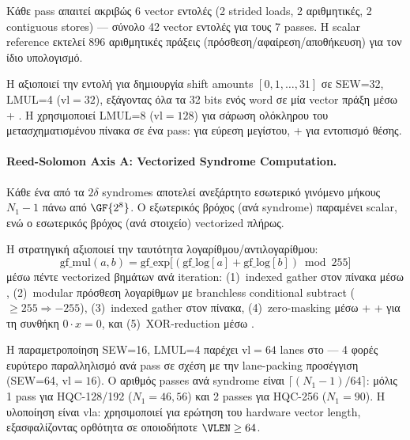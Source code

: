 Κάθε pass απαιτεί ακριβώς \num{6} vector εντολές (2 strided loads, 2
αριθμητικές, 2 contiguous stores) — σύνολο \num{42} vector εντολές για
τους \num{7} passes.  Η scalar reference εκτελεί \num{896} αριθμητικές
πράξεις (πρόσθεση/αφαίρεση/αποθήκευση) για τον ίδιο υπολογισμό.

Η  αξιοποιεί την εντολή  για δημιουργία
shift amounts $[0, 1, \ldots, 31]$ σε SEW=32, LMUL=4 ($\text{vl}=32$),
εξάγοντας όλα τα \num{32} bits ενός  word σε μία vector
πράξη μέσω  + .  Η  χρησιμοποιεί
LMUL=8 ($\text{vl}=128$) για σάρωση ολόκληρου του μετασχηματισμένου
πίνακα σε ένα pass:  για εύρεση μεγίστου,  +
 για εντοπισμό θέσης.

\paragraph{Reed-Solomon Axis A: Vectorized Syndrome Computation.}
Κάθε ένα από τα $2\delta$ syndromes αποτελεί ανεξάρτητο εσωτερικό γινόμενο
μήκους $N_1 - 1$ πάνω από $\GF{2^8}$.  Ο εξωτερικός βρόχος (ανά syndrome)
παραμένει scalar, ενώ ο εσωτερικός βρόχος (ανά στοιχείο) vectorized πλήρως.

Η στρατηγική αξιοποιεί την ταυτότητα λογαρίθμου/αντιλογαρίθμου:
\begin{equation}
  \text{gf\_mul}(a, b) = \text{gf\_exp}\bigl[(\text{gf\_log}[a] + \text{gf\_log}[b]) \bmod 255\bigr]
\end{equation}
%
μέσω πέντε vectorized βημάτων ανά iteration: (1)~indexed gather στον
 πίνακα μέσω , (2)~modular πρόσθεση
λογαρίθμων με branchless conditional subtract ($\geq 255 \Rightarrow -255$),
(3)~indexed gather στον  πίνακα, (4)~zero-masking μέσω
 +  +  για τη συνθήκη $0 \cdot x = 0$,
και (5)~XOR-reduction μέσω .

Η παραμετροποίηση SEW=16, LMUL=4 παρέχει $\text{vl}=64$ lanes στο
 — \num{4} φορές ευρύτερο παραλληλισμό ανά pass σε σχέση με
την \Zvbc lane-packing προσέγγιση (SEW=64, $\text{vl}=16$).  Ο αριθμός
passes ανά syndrome είναι $\lceil (N_1 - 1) / 64 \rceil$: μόλις \num{1}
pass για HQC-128/192 ($N_1 = 46, 56$) και \num{2} passes για HQC-256
($N_1 = 90$).  Η υλοποίηση είναι \gls{vla}: χρησιμοποιεί
 για ερώτηση του hardware vector length, εξασφαλίζοντας
ορθότητα σε οποιοδήποτε $\VLEN \geq 64$.

